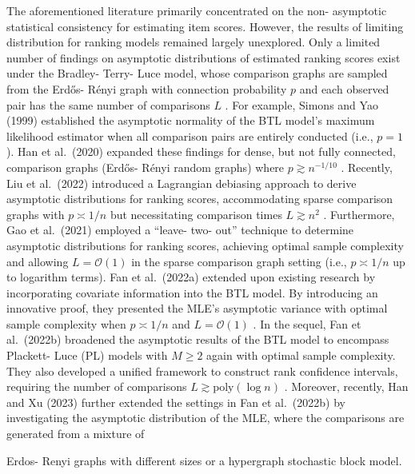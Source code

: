 The aforementioned literature primarily concentrated on the non-
asymptotic statistical consistency for estimating item scores. However,
the results of limiting distribution for ranking models remained largely
unexplored. Only a limited number of findings on asymptotic
distributions of estimated ranking scores exist under the Bradley-
Terry- Luce model, whose comparison graphs are sampled from the Erdős-
Rényi graph with connection probability \(p\) and each observed pair has
the same number of comparisons \(L\) . For example, Simons and Yao
(1999) established the asymptotic normality of the BTL model's maximum
likelihood estimator when all comparison pairs are entirely conducted
(i.e., \(p = 1\) ). Han et al.~(2020) expanded these findings for dense,
but not fully connected, comparison graphs (Erdős- Rényi random graphs)
where \(p \gtrsim n^{- 1 / 10}\) . Recently, Liu et al.~(2022)
introduced a Lagrangian debiasing approach to derive asymptotic
distributions for ranking scores, accommodating sparse comparison graphs
with \(p \asymp 1 / n\) but necessitating comparison times
\(L \gtrsim n^2\) . Furthermore, Gao et al.~(2021) employed a ``leave-
two- out'' technique to determine asymptotic distributions for ranking
scores, achieving optimal sample complexity and allowing
\(L = \mathcal{O}(1)\) in the sparse comparison graph setting (i.e.,
\(p \asymp 1 / n\) up to logarithm terms). Fan et al.~(2022a) extended
upon existing research by incorporating covariate information into the
BTL model. By introducing an innovative proof, they presented the MLE's
asymptotic variance with optimal sample complexity when
\(p \asymp 1 / n\) and \(L = \mathcal{O}(1)\) . In the sequel, Fan et
al.~(2022b) broadened the asymptotic results of the BTL model to
encompass Plackett- Luce (PL) models with \(M \geq 2\) again with
optimal sample complexity. They also developed a unified framework to
construct rank confidence intervals, requiring the number of comparisons
\(L \gtrsim \mathrm{poly}(\log n)\) . Moreover, recently, Han and Xu
(2023) further extended the settings in Fan et al.~(2022b) by
investigating the asymptotic distribution of the MLE, where the
comparisons are generated from a mixture of

Erdos- Renyi graphs with different sizes or a hypergraph stochastic
block model.

